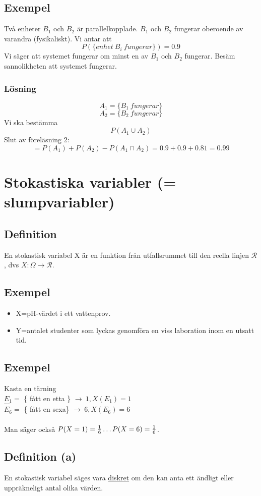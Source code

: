 \documentclass{article}
\begin{document}
\subsection{Exempel}
Två enheter $B_1$ och $B_2$ är parallelkopplade. $B_1$ och $B_2$ fungerar oberoende av varandra (fysikaliskt).
Vi antar att
$$ P(\{ enhet\ B_i\ fungerar \}) = 0.9 $$
Vi säger att systemet fungerar om minst en av $B_1$ och $B_2$ fungerar. Besäm sannolikheten att systemet fungerar.
\subsubsection{Lösning}
$$ A_1=\{ B_1\ fungerar\} $$
$$ A_2=\{ B_2\ fungerar\} $$
Vi ska bestämma
$$ P(A_1\cup A_2) $$
Slut av föreläsning 2:
$$ = P(A_1) + P(A_2) - P(A_1 \cap A_2) = 0.9+0.9+0.81 = 0.99 $$

\section{Stokastiska variabler (= slumpvariabler)}
\subsection{Definition}
En stokastisk variabel X är en funktion från utfallsrummet till den reella linjen $\mathcal{R}$, dvs $X: \Omega \rightarrow \mathcal{R}$.
\subsection{Exempel}
\begin{itemize}
    \item X=pH-värdet i ett vattenprov.\\
    \item Y=antalet studenter som lyckas genomföra en viss laboration inom en utsatt tid.
\end{itemize}
\subsection{Exempel}
Kasta en tärning\\
$E_1 =$ \{ fått en etta \} $\longrightarrow\ 1, X(E_1)=1$\\
$\dots$ \\
$E_6 =$ \{ fått en sexa\} $\longrightarrow\ 6, X(E_6)=6$\\\\
Man säger också $P(X=1)=\frac{1}{6}\dots P(X=6)=\frac{1}{6}$.

\subsection{Definition (a)}
En stokastisk variabel säges vara \underline{diskret} om den kan anta ett ändligt eller uppräkneligt antal olika värden.
\end{document}

